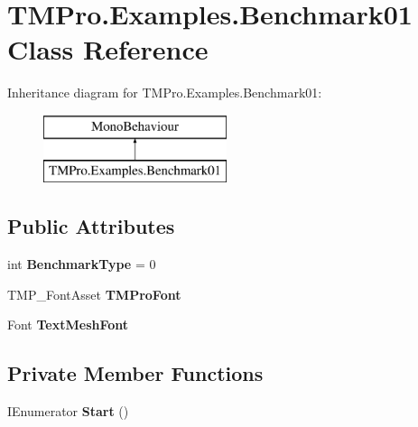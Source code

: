 \hypertarget{class_t_m_pro_1_1_examples_1_1_benchmark01}{}\section{T\+M\+Pro.\+Examples.\+Benchmark01 Class Reference}
\label{class_t_m_pro_1_1_examples_1_1_benchmark01}
Inheritance diagram for T\+M\+Pro.\+Examples.\+Benchmark01\+:\begin{figure}[H]
\begin{center}
\leavevmode
\includegraphics[height=2.000000cm]{class_t_m_pro_1_1_examples_1_1_benchmark01}
\end{center}
\end{figure}
\subsection*{Public Attributes}
\begin{DoxyCompactItemize}
\item 
\mbox{\label{class_t_m_pro_1_1_examples_1_1_benchmark01_adb8b4f7e8213b2c146e8d8e1b88180dc}} 
int {\bfseries Benchmark\+Type} = 0
\item 
\mbox{\label{class_t_m_pro_1_1_examples_1_1_benchmark01_ac150b09608aaf2f8e06fa0703496c864}} 
T\+M\+P\+\_\+\+Font\+Asset {\bfseries T\+M\+Pro\+Font}
\item 
\mbox{\label{class_t_m_pro_1_1_examples_1_1_benchmark01_a8e58d54eac5c21bc055263ff7689322f}} 
Font {\bfseries Text\+Mesh\+Font}
\end{DoxyCompactItemize}
\subsection*{Private Member Functions}
\begin{DoxyCompactItemize}
\item 
\mbox{\label{class_t_m_pro_1_1_examples_1_1_benchmark01_aa55f468ecf85b127e95cff7bcccf1db9}} 
I\+Enumerator {\bfseries Start} ()
\end{DoxyCompactItemize}
